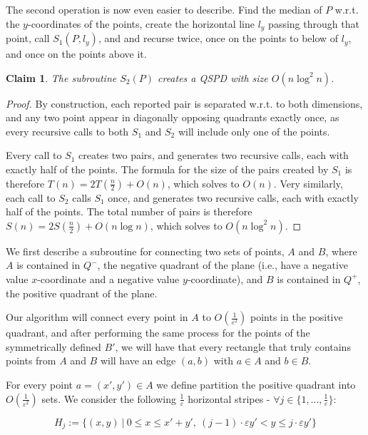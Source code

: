 \documentclass{article}
\newtheorem{claim}[theorem]{Claim}
\newcommand{\eps}{\varepsilon}
\begin{document}
	The second operation is now even easier to describe. Find the median of $P$ w.r.t. the $y$-coordinates of the points, create the horizontal line $l_y$ passing through that point, call $S_1(P,l_y)$, and and recurse twice, once on the points to below of $l_y$, and once on the points above it.

	\begin{claim}
		The subroutine $S_2(P)$ creates a QSPD with size $O(n\log^2n)$.
	\end{claim}

	\begin{proof}
		By construction, each reported pair is separated w.r.t. to both dimensions, and any two point appear in diagonally opposing quadrants exactly once, as every recursive calls to both $S_1$ and $S_2$ will include only one of the points.
		
		Every call to $S_1$ creates two pairs, and generates two recursive calls, each with exactly half of the points. The formula for the size of the pairs created by $S_1$ is therefore $T(n)=2T\left( \frac{n}{2}\right) + O(n)$, which solves to $O(n)$. Very similarly, each call to $S_2$ calls $S_1$ once, and generates two recursive calls, each with exactly half of the points. The total number of pairs is therefore $S(n)=2S\left( \frac{n}{2}\right) + O(n\log n)$, which solves to $O(n\log^2n)$.
		
	\end{proof}






	We first describe a subroutine for connecting two sets of points, $A$ and $B$, where $A$ is contained in $Q^-$, the negative quadrant of the plane (i.e., have a negative value $x$-coordinate and a negative value $y$-coordinate), and $B$ is contained in $Q^+$, the positive quadrant of the plane. 
	
	Our algorithm will connect every point in $A$ to $O\left(\frac{1}{\eps^2}\right)$ points in the positive quadrant, and after performing the same process for the points of the symmetrically defined $B'$, we will have that every rectangle that truly contains points from $A$ and $B$ will have an edge $(a,b)$ with $a\in A$ and $b\in B$.
	
	For every point $a = (x',y') \in A$ we define partition the positive quadrant into $O\left(\frac{1}{\eps^2}\right)$ sets. We consider the following $\frac{1}{\eps}$ horizontal stripes - $\forall j\in \{1,...,\frac{1}{\eps}\}$:
	
	$$H_{j}:=\{(x,y)~|~  0 \leq x \leq x'+y'  ,~ (j-1)\cdot \eps y' < y \leq j\cdot \eps y'\}$$
	
\end{document}
